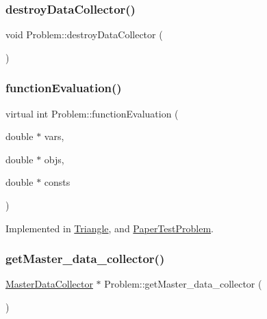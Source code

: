 \subsubsection{\texorpdfstring{destroy\+Data\+Collector()}{destroyDataCollector()}}
{\footnotesize\ttfamily void Problem\+::destroy\+Data\+Collector (\begin{DoxyParamCaption}{ }\end{DoxyParamCaption})}

\mbox{\label{classProblem_acd924a80df4422c5199748c714e9405c}} 
\subsubsection{\texorpdfstring{function\+Evaluation()}{functionEvaluation()}}
{\footnotesize\ttfamily virtual int Problem\+::function\+Evaluation (\begin{DoxyParamCaption}\item[{double $\ast$}]{vars,  }\item[{double $\ast$}]{objs,  }\item[{double $\ast$}]{consts }\end{DoxyParamCaption})\hspace{0.3cm}{\ttfamily [pure virtual]}}



Implemented in \mbox{\hyperlink{classTriangle_a9e95039d098fd61cce1a830b85ed7004}{Triangle}}, and \mbox{\hyperlink{classPaperTestProblem_a6db78df74d40f69a750b164caaca75c7}{Paper\+Test\+Problem}}.

\mbox{\label{classProblem_afce904c6b3bc58d029da4d9077efe4c9}} 
\subsubsection{\texorpdfstring{get\+Master\+\_\+data\+\_\+collector()}{getMaster\_data\_collector()}}
{\footnotesize\ttfamily \mbox{\hyperlink{classMasterDataCollector}{Master\+Data\+Collector}} $\ast$ Problem\+::get\+Master\+\_\+data\+\_\+collector (\begin{DoxyParamCaption}{ }\end{DoxyParamCaption})}

